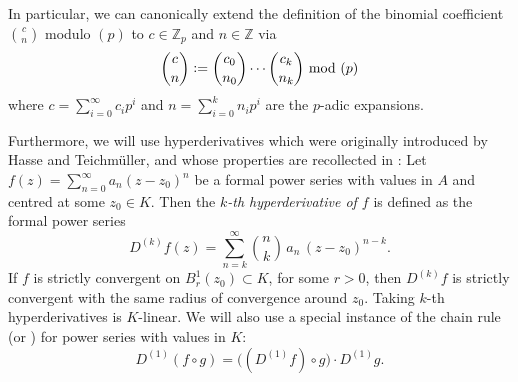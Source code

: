 \documentclass[a4paper, reqno, 10pt]{amsart}
\theoremstyle{definition}
\numberwithin{equation}{section}
\newcommand{\defeq}{\vcentcolon=}
\renewcommand{\mod}{{\,\,\mathrm{mod}\,\,}}
\newcommand{\BZ}{{\mathbb {Z}}}
\begin{document}
In particular, we can canonically extend the definition of the binomial coefficient $\binom{c}{n}$ modulo $(p)$ to $c\in \BZ_p$ and $n \in \BZ$ via 
\[\binom{c}{n} \defeq  \binom{c_0}{n_0} \cdots \binom{c_k}{n_k} \mod (p) \]
where $c= \sum_{i=0}^{\infty} c_i p^i$ and $n = \sum_{i=0}^k n_i p^i $ are the $p$-adic expansions.


Furthermore, we will use hyperderivatives which were originally introduced by Hasse and Teichmüller, and whose properties are recollected in \cite[\S 2]{Jeong11CalcPosChar}:
Let $f(z)=\sum_{n=0}^{\infty} a_n (z-z_0)^n$ be a formal power series with values in $A$ and centred at some $z_0 \in K$.
Then the \textit{$k$-th hyperderivative of $f$} is defined as the formal power series
\[D^{(k)} f (z) = \sum_{n=k}^{\infty} \binom{n}{k} \, a_n \,(z-z_0)^{n-k}  .\]
If $f$ is strictly convergent on $B_r^1(z_0) \subset K$, for some $r>0$, then $D^{(k)}f$ is strictly convergent with the same radius of convergence around $z_0$.
Taking $k$-th hyperderivatives is $K$-linear.
We will also use a special instance of the chain rule \cite[\S 2]{Jeong11CalcPosChar} (or \cite{Hasse36TheoDiffFunktKoerpBelChar}) for power series with values in $K$:
\[D^{(1)}(f\circ g) = \big( ( D^{(1)}f ) \circ g \big)\cdot D^{(1)} g  . \]
\end{document}
